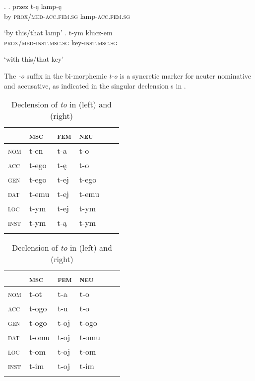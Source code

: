 \ex.\label{przezlampe}
\ag. przez t-\k{e} lamp-\k{e}\\
by \textsc{prox/med-acc.fem.sg} lamp-\textsc{acc.fem.sg}\\
\strut `by this/that lamp'
\bg. t-ym klucz-em\\
\textsc{prox/med-inst.msc.sg} key-\textsc{inst.msc.sg}\\
\strut `with this/that key'

The \textit{-o} suffix in the bi-morphemic \textit{t-o} is a syncretic marker for neuter nominative and accusative, as indicated in the singular declension s in .
  
  
\begin{table}
\caption{Declension of \textit{to} in  (left) and  (right)}
\label{to:decl} 
\begin{tabular}[t]{ l l l l l l }
\lsptoprule	
& \textsc{msc} & \textsc{fem} & \textsc{neu}\\\hline
  \textsc{nom} & t-en & t-a & t-o\cellcolor[gray]{0.9}\\
  \textsc{acc}  & t-ego & t-\k{e} & t-o\cellcolor[gray]{0.9}\\
  \textsc{gen} & t-ego & t-ej & t-ego\\
  \textsc{dat} & t-emu & t-ej & t-emu\\
  \textsc{loc}  & t-ym & t-ej & t-ym\\
  \textsc{inst} & t-ym & t-\k{a} & t-ym\\
  \lspbottomrule
\end{tabular}\hspace{.05\linewidth}
\begin{tabular}[t]{ l l l l l l }
\lsptoprule	
& \textsc{msc} & \textsc{fem} & \textsc{neu}\\\hline
  \textsc{nom} & t-ot & t-a & t-o\cellcolor[gray]{0.9}\\
  \textsc{acc}  & t-ogo & t-u & t-o\cellcolor[gray]{0.9}\\
  \textsc{gen} & t-ogo & t-oj & t-ogo\\
  \textsc{dat}  & t-omu & t-oj & t-omu\\
  \textsc{loc} & t-om & t-oj & t-om\\
  \textsc{inst} & t-im & t-oj & t-im\\
  \lspbottomrule
\end{tabular}
\end{table}


